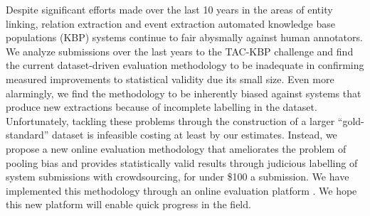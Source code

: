 Despite significant efforts made over the last 10 years in the areas of entity linking, relation extraction and event extraction automated knowledge base populations (KBP) systems continue to fair abysmally against human annotators.
We analyze submissions over the last  years to the TAC-KBP challenge and find the current dataset-driven evaluation methodology to be inadequate in confirming measured improvements to statistical validity due its small size.
Even more alarmingly, we find the methodology to be inherently biased against systems that produce new extractions because of incomplete labelling in the dataset.
Unfortunately, tackling these problems through the construction of a larger ``gold-standard'' dataset is infeasible costing at least  by our estimates.
Instead, we propose a new online evaluation methodology that ameliorates the problem of pooling bias and provides statistically valid results through judicious labelling of system submissions with crowdsourcing, for under \$100 a submission.
We have implemented this methodology through an online evaluation platform .
We hope this new platform will enable quick progress in the field.
